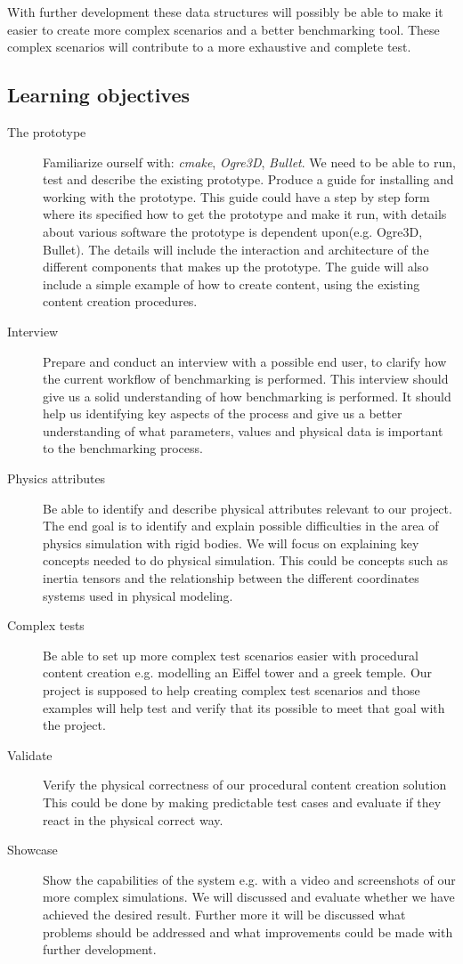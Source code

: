 \documentclass[a4paper, 10pt]{article}
\begin{document}
With further development these data structures will possibly be able to make it easier to create more complex scenarios
and a better benchmarking tool. These complex scenarios will contribute to a more exhaustive and complete test.
\subsection*{Learning objectives}
\begin{description}
\item[The prototype] 	Familiarize ourself with: \emph{cmake}, \emph{Ogre3D}, \emph{Bullet}. 
			We need to be able to run, test and describe the existing prototype.
			Produce a guide for installing and working with the prototype. This guide could have a step by step form
			where its specified how to get the prototype and make it run, with details 
			about various software the prototype is dependent upon(e.g. Ogre3D, Bullet).
			The details will include the interaction and architecture of the different components that
			makes up the prototype. The guide will also include a simple example of how to create content, using the
			existing content creation procedures.

\item[Interview] Prepare and conduct an interview with a possible end user, to clarify how the current workflow of benchmarking is performed.
 		This interview should give us a solid understanding of how benchmarking is performed. It should help us
		identifying key aspects of the process and give us a better understanding of what parameters, values and physical data
		is important to the benchmarking process.
\item[Physics attributes]Be able to identify and describe physical attributes relevant to our project. 
			The end goal is to identify and explain possible difficulties in the
			area of physics simulation with rigid bodies. We will focus on explaining key concepts needed to
			do physical simulation. This could be concepts such as inertia tensors and the relationship between the different coordinates
			systems used in physical modeling.
\item[Complex tests] Be able to set up more complex test scenarios easier with procedural content creation e.g. modelling an Eiffel tower and a
			greek temple. Our project is supposed to help creating complex test scenarios and those examples will help test and verify that
			its possible to meet that goal with the project. 
\item[Validate] Verify the physical correctness of our procedural content creation solution 
		This could be done by making predictable test cases and evaluate if they react in the physical correct way. 
\item[Showcase] Show the capabilities of the system e.g. with a video and screenshots of our more complex simulations. We will discussed and
		evaluate whether we have achieved the desired result. Further more it will be discussed what
		problems should be addressed and what improvements could be made with further development.

\end{description}
\end{document}
